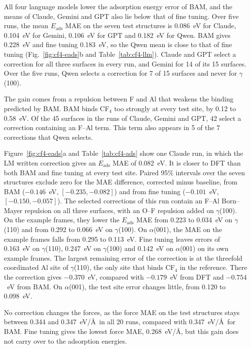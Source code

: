 All four language models lower the adsorption energy error of BAM, and the means of Claude, Gemini and GPT also lie below that of fine tuning. Over five runs, the mean $E_\mathrm{ads}$ MAE on the seven test structures is 0.086~eV for Claude, 0.104~eV for Gemini, 0.106~eV for GPT and 0.182~eV for Qwen. BAM gives 0.228~eV and fine tuning 0.183~eV, so the Qwen mean is close to that of fine tuning (Fig.~\ref{fig:cf4-eads}b and Table~\ref{tab:cf4-llm}). Claude and GPT select a correction for all three surfaces in every run, and Gemini for 14 of its 15 surfaces. Over the five runs, Qwen selects a correction for 7 of 15 surfaces and never for $\gamma$(100).

The gain comes from a repulsion between F and Al that weakens the binding predicted by BAM. BAM binds CF$_4$ too strongly at every test site, by 0.12 to 0.58~eV. Of the 45 surfaces in the runs of Claude, Gemini and GPT, 42 select a correction containing an F--Al term. This term also appears in 5 of the 7 corrections that Qwen selects.

Figure~\ref{fig:cf4-eads}a and Table~\ref{tab:cf4-ads} show one Claude run, in which the LM written correction gives an $E_\mathrm{ads}$ MAE of 0.082~eV. It is closer to DFT than both BAM and fine tuning at every test site. Paired 95\% intervals over the seven structures exclude zero for the MAE difference, corrected minus baseline, from BAM ($-0.146$~eV, $[-0.235, -0.082]$) and from fine tuning ($-0.101$~eV, $[-0.150, -0.057]$). The selected corrections of this run contain an F--Al Born--Mayer repulsion on all three surfaces, with an O--F repulsion added on $\gamma$(100). On the example frames, they lower the $E_\mathrm{ads}$ MAE from 0.223 to 0.034~eV on $\gamma$(110) and from 0.292 to 0.066~eV on $\gamma$(100). On $\alpha$(001), the MAE on the example frames falls from 0.295 to 0.113~eV. Fine tuning leaves errors of 0.163~eV on $\gamma$(110), 0.247~eV on $\gamma$(100) and 0.142~eV on $\alpha$(001) on its own example frames. The largest remaining error of the correction is at the threefold coordinated Al site of $\gamma$(110), the only site that binds CF$_4$ in the reference. There the correction gives $-0.370$~eV, compared with $-0.179$~eV from DFT and $-0.754$~eV from BAM. On $\alpha$(001), the test site error changes little, from 0.120 to 0.098~eV.

No correction changes the forces, as the force MAE on the test structures stays between 0.344 and 0.347~eV/\AA\ in all 20 runs, compared with 0.347~eV/\AA\ for BAM. Fine tuning gives the lowest force MAE, 0.268~eV/\AA, but this gain does not carry over to the adsorption energies.

